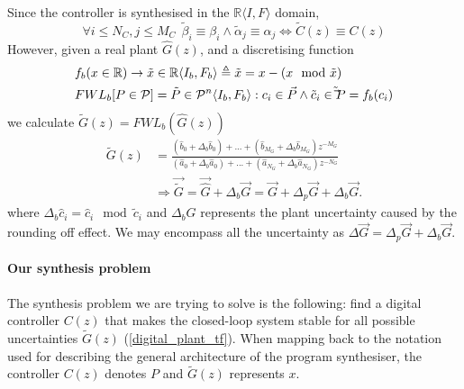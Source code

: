 \documentclass{sig-alternate-05-2015}
\begin{document}
Since the controller is synthesised in the $\mathbb{R}\langle I,F \rangle$
domain,
%
 $$\forall i \leq N_C, j \leq M_C\ \  \tilde \beta_{i} \equiv \beta_{i} \wedge \tilde \alpha_{j} \equiv \alpha_{j} \Leftrightarrow \tilde C(z) \equiv C(z)$$
%
However, given a real plant $\hat{G}(z)$, and a discretising function
%
\begin{align}
\small
\label{FWL_tf}
&f_b (x \in \mathbb{R}) \rightarrow \tilde x \in \mathbb{R}\langle I_b,F_b \rangle \triangleq \tilde x = x-(x\mod\tilde x) \\
&FWL_b[P \in \mathcal{P}] = \tilde P \in \mathcal{P}^{n}\langle I_b,F_b \rangle : c_i \in \vec{P} \wedge \tilde c_i \in \tilde \vec{P}=f_b(c_i)  \nonumber
\end{align}
%
we calculate $\tilde G(z)=FWL_b(\hat{G}(z))$
%
\begin{align}
\label{digital_plant_tf}
\tilde G(z)&=\frac{(\hat{b}_{0}+\Delta_b \hat{b}_{0}) +...+(\hat{b}_{M_G}+\Delta_b \hat{b}_{M_G})z^{-M_G}}{(\hat{a}_{0}+\Delta_b \hat{a}_{0})+...+(\hat{a}_{N_G}+\Delta_b \hat{a}_{N_G})z^{-N_G}} \nonumber \\
&\Rightarrow \vec{\tilde G} =\vec{\hat{G}}+\Delta_b{\vec{G}}=\vec{G}+\Delta_p{\vec{G}}+\Delta_b{\vec{G}}.
\end{align}
where $\Delta_b\hat{c}_i=\hat{c}_i\mod \tilde{c}_i$
and $\Delta_b{G}$ represents the plant uncertainty caused by
the rounding off effect.  We may encompass all the uncertainty as
$\Delta{\vec{G}}=\Delta_p{\vec{G}}+\Delta_b{\vec{G}}$.  %

\paragraph{Our synthesis problem}
The synthesis problem we are trying to solve is the following:
find a digital controller $C(z)$ %
that makes the closed-loop system stable 
for all possible uncertainties 
$\tilde G(z)$ (\ref{digital_plant_tf}).
When mapping back to the notation used for describing the general architecture 
of the program synthesiser, the controller $C(z)$ denotes $P$ and 
$\tilde G(z)$ represents $x$. 
\end{document}
